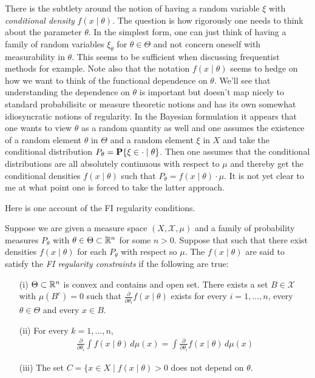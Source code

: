 There is the subtlety around the notion of
having a random variable $\xi$ with \emph{conditional density}
$f(x\mid \theta)$.  The question is how rigorously one needs to think
about the parameter $\theta$.  In the simplest form, one can just
think of having a family of random variables $\xi_\theta$ for $\theta
\in \Theta$ and not concern oneself with measurability in $\theta$.
This seems to be sufficient when discussing frequentist methods for
example.  Note also that the notation $f(x\mid \theta)$ seems to hedge
on how we want to think of the functional dependence on $\theta$.
We'll see that understanding the dependence on $\theta$ is important but doesn't map
nicely to standard probabilisitc or measure theoretic notions and has
its own somewhat idiosyncratic notions of regularity.
In the Bayesian formulation it appears that one wants to
view $\theta$ as a random quantity as well and one assumes the
existence of a random element $\theta$ in $\Theta$ and a random
element $\xi$ in $X$ and take the conditional distribution
$P_\theta = \textbf{P}\{\xi \in \cdot \mid \theta\}$.  Then one assumes that the
conditional distributions are all absolutely continuous with respect
to $\mu$ and thereby get the conditional densities $f(x \mid
\theta)$ such that $P_\theta = f(x \mid \theta) \cdot \mu$.  It is not yet clear to me at what point one is forced to
take the latter approach.

Here is one account of the FI regularity conditions.

\begin{defn}
Suppose we are given a measure space $(X, \mathcal{X}, \mu)$ and a family of
probability measures $P_\theta$ with $\theta \in
\Theta \subset \mathbb{R}^n$ for some $n > 0$.  Suppose that  such that there
exist densities $f(x \mid \theta)$  for each $P_\theta$ with respect so $\mu$.  The $f(x
\mid \theta)$ are said to satisfy the \emph{FI regularity constraints}
if the following are true:
\begin{itemize}
\item[(i)] $\Theta \subset \mathbb{R}^n$ is convex and contains and open
  set.  There exists a set $B \in \mathcal{X}$ with $\mu(B^c) = 0$ such
  that $\frac{\partial}{\partial \theta_i} f(x \mid \theta)$ exists
  for every $i=1, \dots, n$, every $\theta \in \Theta$ and every $x
  \in B$.
\item[(ii)] For every $k = 1,\dots, n$, 
\begin{align*}
\frac{\partial}{\partial \theta_i} \int f(x \mid \theta)
  \, d \mu(x) = \int \frac{\partial}{\partial \theta_i} f(x \mid
  \theta) \, d \mu(x)
\end{align*}
\item[(iii)]The set $C = \lbrace x \in X \mid f(x \mid \theta) >
  0$ does not depend on $\theta$.
\end{itemize}
\end{defn}

